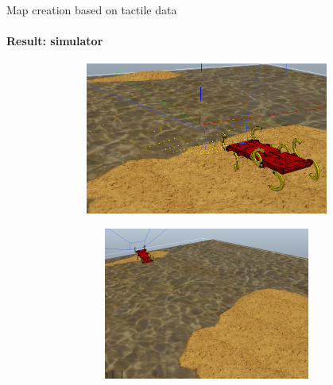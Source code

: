 \documentclass[aspectratio=169]{beamer}
\begin{document}
\begin{frame}[t]{Map creation based on tactile data}
    \framesubtitle{Result: simulator}
    \vspace{-15pt}
    \begin{figure}[H]
        \begin{subfigure}{0.49\textwidth}
            \centering\includegraphics[height=5cm,width=1\textwidth,keepaspectratio]{terrain_w_water1.png}
        \end{subfigure}
        \begin{subfigure}{0.49\textwidth}
            \centering\includegraphics[height=5cm,width=1\textwidth,keepaspectratio]{terrain_w_water_end.png}
        \end{subfigure}
    \end{figure}
\end{frame}
\end{document}
